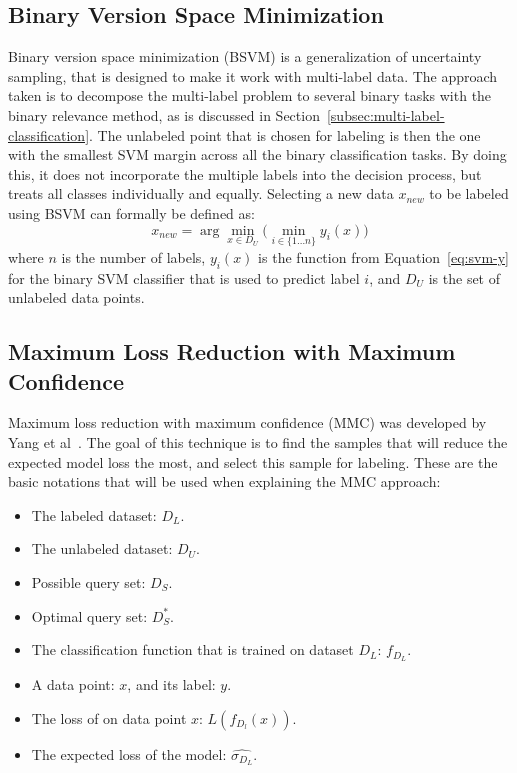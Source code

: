 \subsection{Binary Version Space Minimization}\label{subsec:binmin}

Binary version space minimization (BSVM) is a generalization of uncertainty sampling, that is designed to make it work with multi-label data.
The approach taken is to decompose the multi-label problem to several binary tasks with the binary relevance method, as is discussed in Section~\ref{subsec:multi-label-classification}.
The unlabeled point that is chosen for labeling is then the one with the smallest SVM margin across all the binary classification tasks.
By doing this, it does not incorporate the multiple labels into the decision process, but treats all classes individually and equally. 
Selecting a new data $x_{new}$ to be labeled using BSVM can formally be defined as:
\begin{equation}
    x_{new} = \arg\min_{x \in D_U} \big( \min_{i \in \{1 \dots n\}} y_i(x) \big)
\end{equation}
where $n$ is the number of labels, $y_i(x)$ is the function from Equation~\ref{eq:svm-y} for the binary SVM classifier that is used to predict label $i$, and $D_U$ is the set of unlabeled data points.

\subsection{Maximum Loss Reduction with Maximum Confidence}\label{subsec:mmc}

Maximum loss reduction with maximum confidence (MMC) was developed by Yang et al~\cite{yang2009effective}.
The goal of this technique is to find the samples that will reduce the expected model loss the most, and select this sample for labeling.
These are the basic notations that will be used when explaining the MMC approach:
\begin{itemize}
    \item The labeled dataset: $D_L$.
    \item The unlabeled dataset: $D_U$.
    \item Possible query set: $D_S$.
    \item Optimal query set: $D^*_S$.
    \item The classification function that is trained on dataset $D_L$: $f_{D_L}$.
    \item A data point: $x$, and its label: $y$.
    \item The loss of on data point $x$: $L(f_{D_l}(x))$.
    \item The expected loss of the model: $\widehat{\sigma_{D_L}}$.
\end{itemize}

